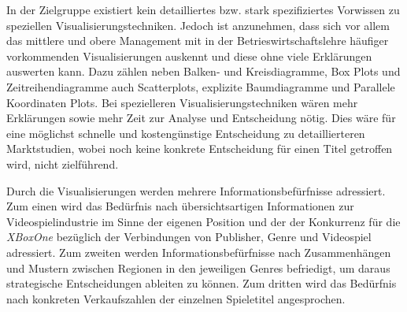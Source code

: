 \documentclass[usegeometry=true]{scrartcl}
\begin{document}
In der Zielgruppe existiert kein detailliertes bzw. stark spezifiziertes Vorwissen zu speziellen Visualisierungstechniken. 
Jedoch ist anzunehmen, dass sich vor allem das mittlere und obere Management mit in der Betrieswirtschaftslehre häufiger vorkommenden Visualisierungen auskennt und diese ohne viele Erklärungen auswerten kann.
Dazu zählen neben Balken- und Kreisdiagramme, Box Plots und Zeitreihendiagramme auch Scatterplots, explizite Baumdiagramme und Parallele Koordinaten Plots. 
Bei spezielleren Visualisierungstechniken wären mehr Erklärungen sowie mehr Zeit zur Analyse und Entscheidung nötig. 
Dies wäre für eine möglichst schnelle und kostengünstige Entscheidung zu detaillierteren Marktstudien, wobei noch keine konkrete Entscheidung für einen Titel getroffen wird, nicht zielführend.

Durch die Visualisierungen werden mehrere Informationsbefürfnisse adressiert. 
Zum einen wird das Bedürfnis nach übersichtsartigen Informationen zur Videospielindustrie im Sinne der eigenen Position und der der Konkurrenz für die \textit{XBoxOne} bezüglich der Verbindungen von Publisher, Genre und Videospiel adressiert.
Zum zweiten werden Informationsbefürfnisse nach Zusammenhängen und Mustern zwischen Regionen in den jeweiligen Genres befriedigt, um daraus strategische Entscheidungen ableiten zu können.
Zum dritten wird das Bedürfnis nach konkreten Verkaufszahlen der einzelnen Spieletitel angesprochen.
\end{document}
